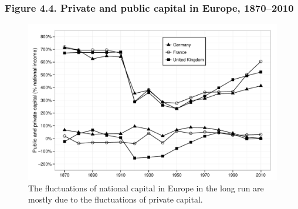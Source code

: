 \documentclass[t]{beamer}\usepackage[]{graphicx}\usepackage[]{color}
\newenvironment{knitrout}{}{} %
\begin{document}
\begin{frame}[label=Figure_4_4]
\frametitle{Figure 4.4. Private and public capital in Europe, 1870--2010}
\begin{figure}[t]
\begin{minipage}[b]{\textwidth}
\centering
\begin{knitrout}\footnotesize
{}\color{fgcolor}

{\centering \includegraphics[width=1\linewidth]{figures/bw/Figure_4_4} 

}



\end{knitrout}
\caption{The fluctuations of national capital in Europe in the long run are mostly due to the fluctuations of private capital.}
\end{minipage}
\end{figure}
\end{frame}
\end{document}
